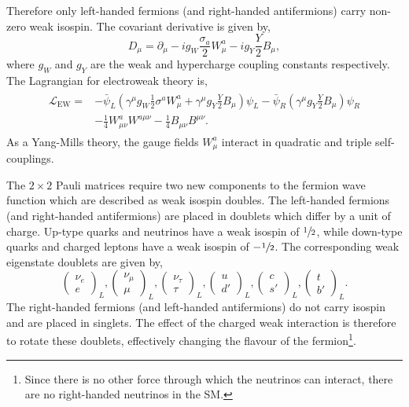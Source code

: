 Therefore only left-handed fermions (and right-handed antifermions) carry non-zero weak isospin.
The covariant derivative is given by,
\begin{equation}
	\label{eq:ew_covariant_derivative}
	D_\mu = \partial_\mu - i g_W \frac{\sigma_a}{2} W_\mu^a - i g_Y \frac{Y}{2} B_\mu,
\end{equation}
where $g_W$ and $g_Y$ are the weak and hypercharge coupling constants respectively.
The Lagrangian for electroweak theory is,
\begin{align}
	\begin{split}
		\label{eq:ew_lagrangian}
		\mathcal{L}_\text{EW} = & - \bar{\psi}_L \left( \gamma^\mu g_W \frac{1}{2} \sigma^a W^a_\mu + \gamma^\mu g_Y \frac{Y}{2} B_\mu \right) \psi_L - \bar{\psi}_R \left( \gamma^\mu g_Y \frac{Y}{2} B_\mu \right) \psi_R \\
		                        & - \frac{1}{4} W_{\mu\nu}^a W^{a\mu\nu} - \frac{1}{4} B_{\mu\nu} B^{\mu\nu}.
	\end{split}
\end{align}
As a Yang-Mills theory, the gauge fields $W_\mu^a$ interact in quadratic and triple self-couplings.

The $2 \times 2$ Pauli matrices require two new components to the fermion wave function which are described as weak isospin doubles.
The left-handed fermions (and right-handed antifermions)
are placed in doublets which differ by a unit of charge.
Up-type quarks and neutrinos have a weak isospin of $\sfrac{1}{2}$, while down-type quarks and charged leptons have a weak isospin of $-\sfrac{1}{2}$.
The corresponding weak eigenstate doublets are given by,
\begin{equation}
	\label{eq:weak_isospin}
	\begin{pmatrix} \nu_e \\ e \end{pmatrix}_L,
	\begin{pmatrix} \nu_\mu \\ \mu \end{pmatrix}_L,
	\begin{pmatrix} \nu_\tau \\ \tau \end{pmatrix}_L,
	\begin{pmatrix} u \\ d' \end{pmatrix}_L,
	\begin{pmatrix} c \\ s' \end{pmatrix}_L,
	\begin{pmatrix} t \\ b' \end{pmatrix}_L.
\end{equation}
The right-handed fermions (and left-handed antifermions) do not carry isospin and are placed in singlets.
The effect of the charged weak interaction is therefore to rotate these doublets, effectively changing the flavour of the fermion\footnote{Since there is no other force through which the neutrinos can interact, there are no right-handed neutrinos in the SM.}.

